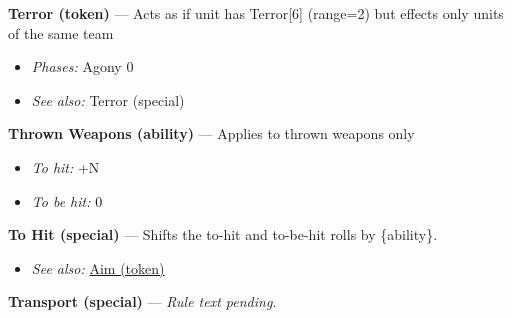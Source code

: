\documentclass[a4paper,12pt]{article}
\begin{document}
\label{rule-token-terror}%
\noindent\textbf{Terror (token)} --- Acts as if unit has Terror[6] (range=2) but effects only units of the same team
\begin{itemize}
\item \textit{Phases:} Agony 0
\item \textit{See also:} Terror (special)
\end{itemize}


\label{rule-ability-thrown-weapons}%
\noindent\textbf{Thrown Weapons (ability)} --- Applies to thrown weapons only
\begin{itemize}
\item \textit{To hit:} +N
\item \textit{To be hit:} 0
\end{itemize}


\label{rule-special-to-hit}%
\noindent\textbf{To Hit (special)} --- Shifts the to-hit and to-be-hit rolls by \{ability\}.
\begin{itemize}
\item \textit{See also:} \hyperref[rule-token-aim]{Aim (token)}
\end{itemize}


\label{rule-special-transport}%
\noindent\textbf{Transport (special)} --- \textit{Rule text pending.}
\end{document}
